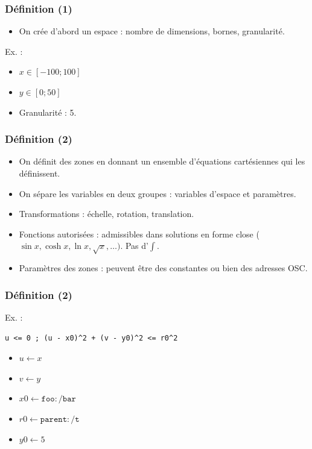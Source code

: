 \documentclass{beamer}
\begin{document}

\begin{frame}
    \frametitle{Définition (1)}\Large
    \begin{itemize}
        \item On crée d'abord un espace : nombre de dimensions, bornes, granularité.
    \end{itemize}
    
    Ex. : 
    \begin{itemize}
        \item $x \in [-100; 100]$
        \item $y \in [0; 50]$
        \item Granularité : 5.
    \end{itemize}
\end{frame}

\begin{frame}[fragile]
    \frametitle{Définition (2)}\Large
    \begin{itemize}
        \item On définit des zones en donnant un ensemble d'équations cartésiennes qui les définissent.
        \item On sépare les variables en deux groupes : variables d'espace et paramètres.
        \item Transformations : échelle, rotation, translation.
        \item Fonctions autorisées : admissibles dans solutions en forme close ($\sin x, \cosh x, \ln x, \sqrt x, \dots)$. Pas d'$\int$.
        \item Paramètres des zones : peuvent être des constantes ou bien des adresses OSC.
    \end{itemize}
    
\end{frame}

\begin{frame}[fragile]
    \frametitle{Définition (2)}\Large
    Ex. : 
    
    \begin{lstlisting}[columns=fullflexible]
    u <= 0 ; (u - x0)^2 + (v - y0)^2 <= r0^2     
    \end{lstlisting}
    \begin{itemize}
        \item $u \leftarrow x$
        \item $v \leftarrow y$
        \item $x0 \leftarrow \mathtt{foo:/bar}$
        \item $r0 \leftarrow \mathtt{parent:/t}$
        \item $y0 \leftarrow 5$
    \end{itemize}
\end{frame}
\end{document}
